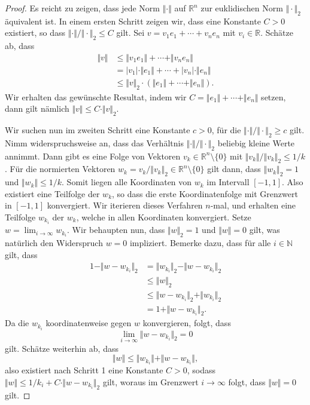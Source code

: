 \documentclass[../main.tex]{subfiles}
\begin{document}
\begin{proof}
  Es reicht zu zeigen, dass jede Norm
  $\Vert \cdot \Vert$ auf $\mathbb{R}^{n}$
  zur euklidischen Norm $\Vert \cdot \Vert_2$
  äquivalent ist.
  In einem ersten Schritt zeigen wir, dass
  eine Konstante $C > 0$ existiert, so dass
  $\Vert \cdot \Vert / \Vert \cdot \Vert_2 \leq C$
  gilt.
  Sei $v = v_1 e_1 +\cdots + v_n e_n$ mit $v_i \in \mathbb{R}$.
  Schätze ab, dass
  \begin{align*}
    \Vert v \Vert
    &\leq \Vert v_1 e_1 \Vert + \cdots + \Vert v_n e_n \Vert \\
    &= |v_1| \cdot \Vert e_1 \Vert + \cdots + |v_n| \cdot \Vert e_n \Vert \\
    &\leq \Vert v \Vert_2 \cdot (\Vert e_1 \Vert + \cdots + \Vert e_n \Vert).
  \end{align*}
  Wir erhalten das gewünschte Resultat, indem wir
  $C = \Vert e_1 \Vert + \cdots + \Vert e_n \Vert$ setzen,
  dann gilt nämlich $\Vert v \Vert \leq C \cdot \Vert v \Vert_2$.

  Wir suchen nun im zweiten Schritt
  eine Konstante $c > 0$, für die $\Vert \cdot \Vert / \Vert \cdot \Vert_2
  \geq c$ gilt.
  Nimm widerspruchsweise an, dass das Verhältnis $\Vert \cdot \Vert /
  \Vert \cdot \Vert_2$ beliebig kleine Werte annimmt.
  Dann gibt es eine Folge von Vektoren
  $v_k \in \mathbb{R}^n \setminus \{0\}$ mit
  $\Vert v_k \Vert / \Vert v_k \Vert_2 \leq 1/k$.
  Für die normierten Vektoren $w_k = v_k / \Vert v_k \Vert_2
  \in \mathbb{R}^n \setminus \{0\}$
  gilt dann, dass $\Vert w_k \Vert_2 = 1$
  und $\Vert w_k \Vert \leq 1/k$.
  Somit liegen alle Koordinaten von $w_k$
  im Intervall $[-1, 1]$.
  Also existiert eine Teilfolge
  der $w_k$, so dass die erste Koordinatenfolge
  mit Grenzwert in $[-1, 1]$ konvergiert.
  Wir iterieren dieses Verfahren $n$-mal,
  und erhalten eine Teilfolge $w_{k_i}$ der $w_k$,
  welche in allen Koordinaten konvergiert.
  Setze $w = \lim_{i \to \infty} w_{k_i}$.
  Wir behaupten nun, dass $\Vert w \Vert_2 = 1$
  und $\Vert w \Vert = 0$ gilt, was
  natürlich den Widerspruch $w = 0$ impliziert.
  Bemerke dazu, dass für alle $i \in \mathbb{N}$
  gilt, dass
  \begin{align*}
     1 - \Vert w - w_{k_i} \Vert_2
     &= \Vert w_{k_i} \Vert_2 - \Vert w - w_{k_i} \Vert_2  \\
     &\leq \Vert w \Vert_2 \\
     &\leq \Vert w - w_{k_i} \Vert_2 + \Vert w_{k_i} \Vert_2 \\
    &= 1 + \Vert w - w_{k_i} \Vert_2.
  \end{align*}
  Da die $w_{k_i}$ koordinatenweise gegen $w$ konvergieren, folgt, dass
  \[
    \lim_{i \to \infty} \Vert w - w_{k_i}\Vert_2 = 0
  \]
  gilt. Schätze weiterhin ab, dass
  \[
     \Vert w \Vert
     \leq \Vert w_{k_i} \Vert + \Vert w - w_{k_i} \Vert ,
  \]
  also existiert nach Schritt 1 eine Konstante
  $C > 0$, sodass $\Vert w \Vert \leq 1/k_i + C \cdot
  \Vert w - w_{k_i} \Vert_2$
  gilt, woraus im Grenzwert $i \to \infty$ folgt,
  dass $\Vert w \Vert = 0$ gilt.
\end{proof}
\end{document}
